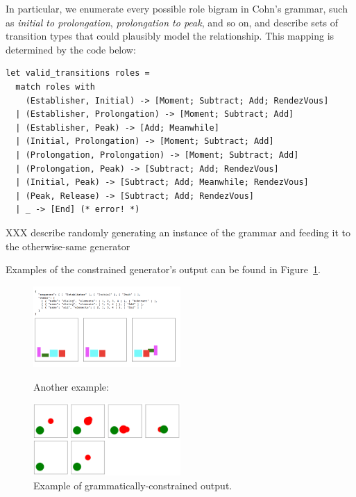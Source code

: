 
In particular, we enumerate every possible role bigram in Cohn's grammar,
such as {\em initial to prolongation}, {\em prolongation to peak}, and so
on, and describe sets of transition types that could plausibly model the
relationship. This mapping is determined by the code below:

\begin{Verbatim}[fontsize=\scriptsize]
let valid_transitions roles =
  match roles with
    (Establisher, Initial) -> [Moment; Subtract; Add; RendezVous]
  | (Establisher, Prolongation) -> [Moment; Subtract; Add]
  | (Establisher, Peak) -> [Add; Meanwhile]
  | (Initial, Prolongation) -> [Moment; Subtract; Add]
  | (Prolongation, Prolongation) -> [Moment; Subtract; Add]
  | (Prolongation, Peak) -> [Subtract; Add; RendezVous]
  | (Initial, Peak) -> [Subtract; Add; Meanwhile; RendezVous]
  | (Peak, Release) -> [Subtract; Add; RendezVous]
  | _ -> [End] (* error! *)
\end{Verbatim}

XXX describe randomly generating an instance of the grammar and feeding it
to the otherwise-same generator

Examples of the constrained generator's output can be found in
Figure~\ref{fig:outgood}.

\begin{figure}
\caption{Example of grammatically-constrained output.}

\includegraphics[width=0.5\textwidth]{comicgen-output-constrained-1.png}

Another example:

\includegraphics[width=0.5\textwidth]{comicgen-output-4.png}

\label{fig:outgood}
\end{figure}



